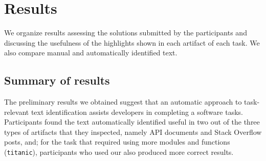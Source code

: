 
\section{Results}
\label{cp6:results}

We organize results assessing the solutions submitted by the participants
and discussing the usefulness of the highlights shown 
in each artifact of each task. We also compare manual and automatically identified text.









\subsection{Summary of results}


The preliminary results we obtained suggest that 
an automatic approach to task-relevant text identification
assists 
developers in completing a software tasks. 
Participants found the text automatically identified
useful in two out of the three types of artifacts that they inspected, 
namely API documents and Stack Overflow posts, and; 
for the task that required using more modules and functions (\texttt{titanic}),
participants who used our also produced more correct results.


